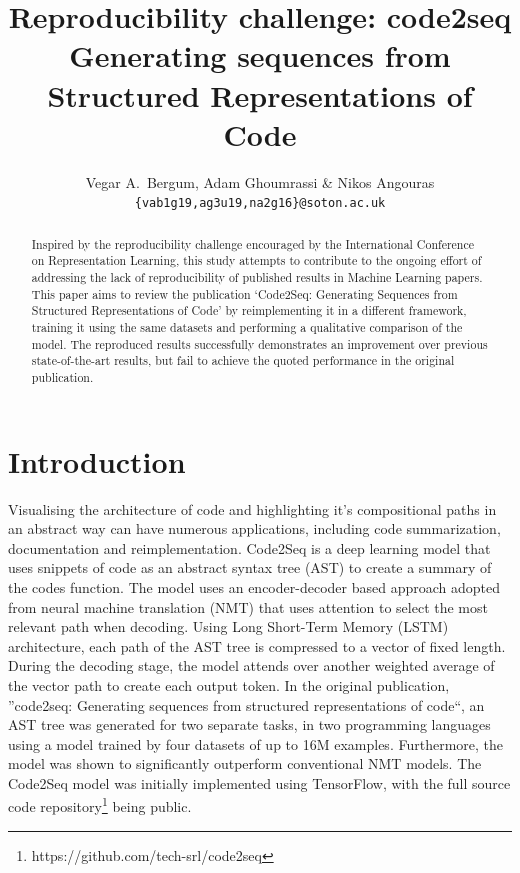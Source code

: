 \documentclass{article} %
\title{Reproducibility challenge: code2seq\\
\large Generating sequences from Structured Representations of Code}
\author{Vegar A.~Bergum, Adam Ghoumrassi \& Nikos Angouras \\
\texttt{\{vab1g19,ag3u19,na2g16\}@soton.ac.uk}
}
\begin{document}
\maketitle

\begin{abstract}
Inspired by the reproducibility challenge encouraged by the International Conference on Representation Learning, this study attempts to contribute to the ongoing effort of addressing the lack of reproducibility of published results in Machine Learning papers. This paper aims to review the publication ‘Code2Seq: Generating Sequences from Structured Representations of Code’ by reimplementing it in a different framework, training it using the same datasets and performing a qualitative comparison of the model. The reproduced results successfully demonstrates an improvement over previous state-of-the-art results, but fail to achieve the quoted performance in the original publication.
\end{abstract}

\section{Introduction} 
Visualising the architecture of code and highlighting it's compositional paths in an abstract way can have numerous applications, including code summarization, documentation and reimplementation. Code2Seq \citep{alon2019} is a deep learning model that uses snippets of code as an abstract syntax tree (AST) to create a summary of the codes function. The model uses an encoder-decoder \citep{cho2014,sutskever2014} based approach adopted from neural machine translation (NMT) that uses attention \citep{bahdanau2015} to select the most relevant path when decoding. Using Long Short-Term Memory (LSTM) architecture, each path of the AST tree is compressed to a vector of fixed length. During the decoding stage, the model attends over another weighted average of the vector path to create each output token. In the original publication, ''code2seq: Generating sequences from structured representations of code``, an AST tree was generated for two separate tasks, in two programming languages using a model trained by four datasets of up to 16M examples. Furthermore, the model was shown to significantly outperform conventional NMT models. The Code2Seq model was initially implemented using TensorFlow, with the full source code repository\footnote{https://github.com/tech-srl/code2seq} being public.
\end{document}

